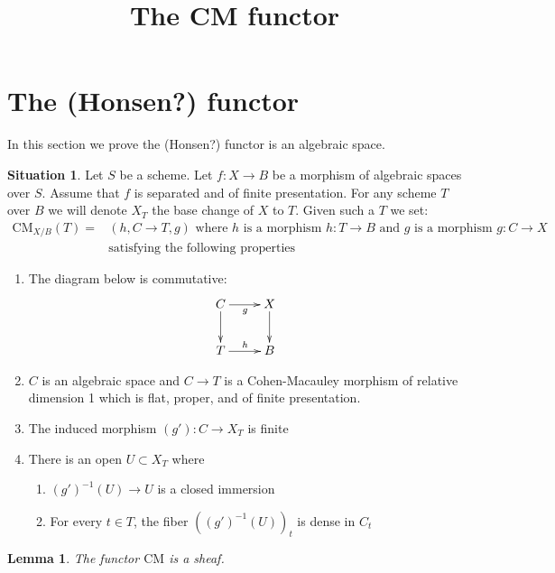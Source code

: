 \documentclass{stacks-project}
\theoremstyle{plain}
\newtheorem{lemma}[subsection]{Lemma}
\theoremstyle{definition}
\newtheorem{situation}[subsection]{Situation}
\theoremstyle{remark}
\numberwithin{equation}{subsection}
\def\CMfunctor{\mathcal{C}\!{\it oh}}
\def\CMfunctor{\text{CM}}
\begin{document}
\title{The CM functor}


\maketitle


\section{The (Honsen?) functor}
\label{section-cm}

\noindent
In this section we prove the (Honsen?) functor is an algebraic space.\\

\begin{situation}
\label{situation-cm}
Let $S$ be a scheme. Let $f : X \to B$ be a morphism of algebraic spaces
over $S$. Assume that $f$ is separated and of finite presentation.
For any scheme $T$ over $B$ we will denote $X_T$ the base change
of $X$ to $T$. Given such a $T$ we set:
\begin{align*}
\CMfunctor_{X/B}(T) = & (h, C \to T, g)  \text{ where } 
h \text{ is a morphism } h : T \to B \text{ and } g \text{ is a morphism } g : C \to X \\ & \text{satisfying the following properties}
\end{align*}
\begin{enumerate}
\item\label{situation-cm-diagram} The diagram below is commutative: 
$$
\xymatrix{
C \ar[r]_g \ar[d] & X \ar[d] \\
T \ar[r]^h & B
}
$$
\item\label{situation-cm-morphism} $C$ is an algebraic space and $C \to T$ is a Cohen-Macauley morphism of relative dimension 1 which is flat, proper, and of finite presentation.
\item\label{situation-cm-finite} The induced morphism $(g') : C \to X_T$ is finite
\item\label{situation-cm-open} There is an open $U \subset X_T$ where
\begin{enumerate}
\item $(g')^{-1}(U) \to U$ is a closed immersion
\item For every $t \in T$, the fiber $\left((g')^{-1}(U)\right)_t$ is dense in $C_t$
\end{enumerate}
\end{enumerate}
\end{situation}
\begin{lemma}
	The functor $\CMfunctor$ is a sheaf.
	\label{cm-is-sheaf}
\end{lemma}
\end{document}
